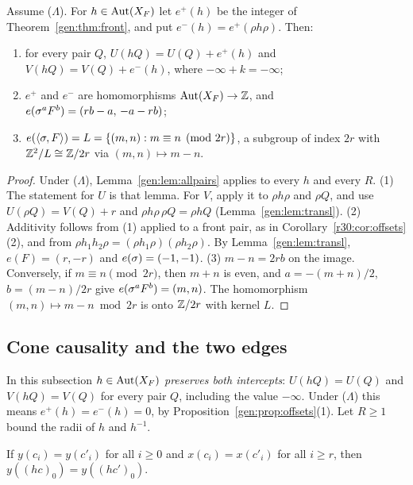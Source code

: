 \begin{proposition}[offsets]\label{gen:prop:offsets}
Assume \textup{($\Lambda$)}. For $h\in\operatorname{Aut}(X_F)$ let $e^+(h)$ be the integer of Theorem~\ref{gen:thm:front}, and put $e^-(h)=e^+(\rho h\rho)$. Then:
\begin{enumerate}
\item for every pair $Q$, $U(hQ)=U(Q)+e^+(h)$ and $V(hQ)=V(Q)+e^-(h)$, where $-\infty+k=-\infty$;
\item $e^+$ and $e^-$ are homomorphisms $\operatorname{Aut}(X_F)\to\mathbb{Z}$, and $e(\sigma^aF^b)=(rb-a,\,-a-rb)$;
\item $e(\langle\sigma,F\rangle)=L=\{(m,n):m\equiv n\pmod{2r}\}$, a subgroup of index $2r$ with $\mathbb{Z}^2/L\cong\mathbb{Z}/2r$ via $(m,n)\mapsto m-n$.
\end{enumerate}
\end{proposition}

\begin{proof}
Under ($\Lambda$), Lemma~\ref{gen:lem:allpairs} applies to every $h$ and every $R$. (1) The statement for $U$ is that lemma. For $V$, apply it to $\rho h\rho$ and $\rho Q$, and use $U(\rho Q)=V(Q)+r$ and $\rho h\rho\,\rho Q=\rho hQ$ (Lemma~\ref{gen:lem:transl}). (2) Additivity follows from (1) applied to a front pair, as in Corollary~\ref{r30:cor:offsets}(2), and from $\rho h_1h_2\rho=(\rho h_1\rho)(\rho h_2\rho)$. By Lemma~\ref{gen:lem:transl}, $e(F)=(r,-r)$ and $e(\sigma)=(-1,-1)$. (3) $m-n=2rb$ on the image. Conversely, if $m\equiv n\pmod{2r}$, then $m+n$ is even, and $a=-(m+n)/2$, $b=(m-n)/2r$ give $e(\sigma^aF^b)=(m,n)$. The homomorphism $(m,n)\mapsto m-n\bmod 2r$ is onto $\mathbb{Z}/2r$ with kernel $L$.
\end{proof}

\subsection{Cone causality and the two edges}\label{gen:sec:cone}

In this subsection $h\in\operatorname{Aut}(X_F)$ \emph{preserves both intercepts}: $U(hQ)=U(Q)$ and $V(hQ)=V(Q)$ for every pair $Q$, including the value $-\infty$. Under ($\Lambda$) this means $e^+(h)=e^-(h)=0$, by Proposition~\ref{gen:prop:offsets}(1). Let $R\ge1$ bound the radii of $h$ and $h^{-1}$.

\begin{proposition}\label{gen:prop:cone}
If $y(c_i)=y(c'_i)$ for all $i\ge0$ and $x(c_i)=x(c'_i)$ for all $i\ge r$, then $y((hc)_0)=y((hc')_0)$.
\end{proposition}

